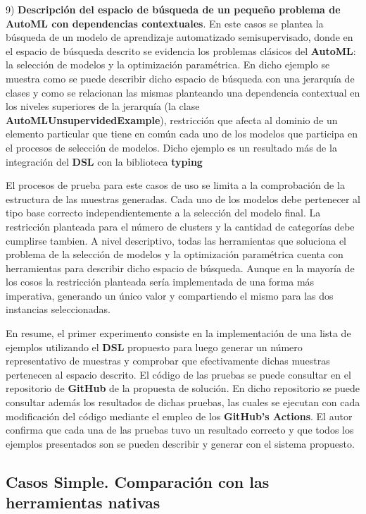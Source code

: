 9) {\bf Descripción del espacio de búsqueda de un pequeño problema de AutoML con dependencias contextuales}. En este casos se plantea la
búsqueda de un modelo de aprendizaje automatizado semisupervisado, donde en el espacio de búsqueda descrito se evidencia los
problemas clásicos del {\bf AutoML}: la selección de modelos y la optimización paramétrica. En dicho ejemplo se muestra como se puede
describir dicho espacio de búsqueda con una jerarquía de clases y como se relacionan las mismas planteando una dependencia contextual
en los niveles superiores de la jerarquía (la clase {\bf AutoMLUnsupervidedExample}), restricción que afecta al dominio de un elemento
particular que tiene en común cada uno de los modelos que participa en el procesos de selección de modelos. Dicho ejemplo es un
resultado más de la integración del {\bf DSL} con la biblioteca {\bf typing}

El procesos de prueba para este casos de uso se limita a la comprobación de la estructura de las muestras generadas. Cada uno de
los modelos debe pertenecer al tipo base correcto independientemente a la
selección del modelo final. La restricción planteada para el número de clusters y la cantidad de categorías debe cumplirse tambien.
A nivel descriptivo, todas las herramientas que soluciona el problema de la selección de modelos y la optimización paramétrica
cuenta con herramientas para describir dicho espacio de búsqueda. Aunque en la mayoría de los cosos la restricción planteada sería
implementada de una forma más imperativa, generando un único valor y compartiendo el mismo para las dos instancias seleccionadas.

En resume, el primer experimento consiste en la implementación de una lista de ejemplos utilizando el {\bf DSL} propuesto para luego generar
un número representativo de muestras y comprobar que efectivamente dichas muestras pertenecen al espacio descrito. El código de las
pruebas se puede consultar en el repositorio de {\bf GitHub} de la propuesta de solución. En dicho repositorio se puede consultar además los
resultados de dichas pruebas, las cuales se ejecutan con cada modificación del código mediante el empleo de los {\bf GitHub's Actions}.
El autor confirma que cada una de las pruebas tuvo un resultado correcto y que todos los ejemplos presentados son se pueden describir y
generar con el sistema propuesto.

\subsection*{Casos Simple. Comparación con las herramientas nativas}




